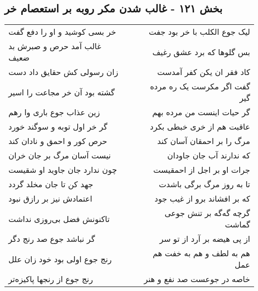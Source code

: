 \begin{center}
\section*{بخش ۱۲۱ - غالب شدن مکر روبه بر استعصام خر}
\label{sec:sh121}
\begin{longtable}{l p{0.5cm} r}
خر بسی کوشید و او را دفع گفت
&&
لیک جوع الکلب با خر بود جفت
\\
غالب آمد حرص و صبرش بد ضعیف
&&
بس گلوها که برد عشق رغیف
\\
زان رسولی کش حقایق داد دست
&&
کاد فقر ان یکن کفر آمدست
\\
گشته بود آن خر مجاعت را اسیر
&&
گفت اگر مکرست یک ره مرده گیر
\\
زین عذاب جوع باری وا رهم
&&
گر حیات اینست من مرده بهم
\\
گر خر اول توبه و سوگند خورد
&&
عاقبت هم از خری خبطی بکرد
\\
حرص کور و احمق و نادان کند
&&
مرگ را بر احمقان آسان کند
\\
نیست آسان مرگ بر جان خران
&&
که ندارند آب جان جاودان
\\
چون ندارد جان جاوید او شقیست
&&
جرات او بر اجل از احمقیست
\\
جهد کن تا جان مخلد گردد
&&
تا به روز مرگ برگی باشدت
\\
اعتمادش نیز بر رازق نبود
&&
که بر افشاند برو از غیب جود
\\
تاکنونش فضل بی‌روزی نداشت
&&
گرچه گه‌گه بر تنش جوعی گماشت
\\
گر نباشد جوع صد رنج دگر
&&
از پی هیضه بر آرد از تو سر
\\
رنج جوع اولی بود خود زان علل
&&
هم به لطف و هم به خفت هم عمل
\\
رنج جوع از رنجها پاکیزه‌تر
&&
خاصه در جوعست صد نفع و هنر
\\
\end{longtable}
\end{center}
